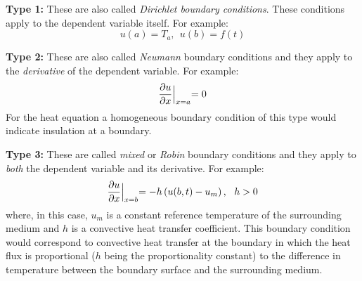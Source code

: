 \vspace{0.5cm}

\noindent\textbf{Type 1:} These are also called \emph{Dirichlet boundary conditions}. These conditions apply to the dependent variable itself.  For example:
\begin{equation*}
u(a) = T_a, \ \ u(b) = f(t)
\end{equation*}

\vspace{0.5cm}

\noindent\textbf{Type 2:} These are also called \emph{Neumann} boundary conditions and they apply to the \emph{derivative} of the dependent variable.  For example:
\begin{equation*}
\frac{\partial u}{\partial x}\Bigl|_{x=a} = 0
\end{equation*}
For the heat equation a homogeneous boundary condition of this type would indicate insulation at a boundary.

\vspace{0.5cm}

\noindent\textbf{Type 3:} These are called \emph{mixed} or \emph{Robin} boundary conditions and they apply to \emph{both} the dependent variable and its derivative.  For example:
\begin{equation*}
\frac{\partial u}{\partial x}\Bigl|_{x=b} = -h\left(u(b,t)-u_m\right), \ \ h>0
\end{equation*}
where, in this case, $u_m$ is a constant reference temperature of the surrounding medium and $h$ is a convective heat transfer coefficient.  This boundary condition would correspond to convective heat transfer at the boundary in which the heat flux is proportional ($h$ being the proportionality constant) to the difference in temperature between the boundary surface and the surrounding medium.


